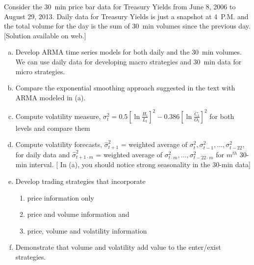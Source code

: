 \prob Consider the 30~min price bar data for Treasury Yields from June 8, 2006 to August 29, 2013. Daily data for Treasury Yields is just a snapshot at 4~P.M. and the total volume for the day is the sum of 30~min volumes since the previous day. [Solution available on web.]
   \begin{enumerate}[(a)]
   \item Develop ARMA time series models for both daily and the 30~min volumes. We can use daily data
for developing macro strategies and 30~min data for micro strategies.
\item Compare the exponential smoothing approach suggested in the text with ARMA modeled in (a).
   \item Compute volatility measure, $\sigma_t^2 = 0.5[\ln{\frac{H_t}{L_t}}]^2 - 0.386[\ln{\frac{C_t}{O_t}}]^2$ for both levels and compare them
   \item Compute volatility forecasts, $\hat{\sigma}_{t+1}^2$ = weighted average of $\sigma_{t}^2, \sigma_{t-1}^2,...,\sigma_{t-22}^2$, for daily data and $\hat{\sigma}_{t+1\cdot m}^2$ = weighted average of $\sigma_{t\cdot m}^2,...,\sigma_{t-22\cdot m}^2$ for $m^{th}$ 30-min interval. [ In (a), you should notice strong seasonality in the 30-min data]
   \item Develop trading strategies that incorporate
      \begin{enumerate}
      \item price information only
      \item price and volume information and
      \item price, volume and volatility information
      \end{enumerate}
         \item Demonstrate that volume and volatility add value to the enter/exist strategies.
   \end{enumerate}




 


\addtocounter{total}{\theproblem}
